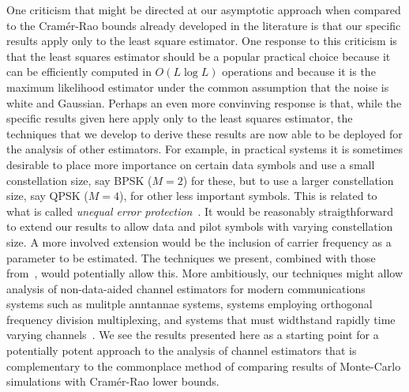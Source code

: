 \documentclass[journal]{IEEEtran}
\begin{document}

One criticism that might be directed at our asymptotic approach when compared to the Cram\'{e}r-Rao bounds already developed in the literature is that our specific results apply only to the least square estimator.  One response to this criticism is that the least squares estimator should be a popular practical choice because it can be efficiently computed in $O(L\log L)$ operations and because it is the maximum likelihood estimator under the common assumption that the noise is white and Gaussian.  Perhaps an even more convinving response is that, while the specific results given here apply only to the least squares estimator, the techniques that we develop to derive these results are now able to be deployed for the analysis of other estimators.  For example, in practical systems it is sometimes desirable to place more importance on certain data symbols and use a small constellation size, say BPSK ($M=2$) for these, but to use a larger constellation size, say QPSK ($M=4$), for other less important symbols.  This is related to what is called \emph{unequal error protection}~\cite{Aydinlik_turbo_uep_2008,Sandberg_uep_ldpc_2010}.  It would be reasonably straigthforward to extend our results to allow data and pilot symbols with varying constellation size.  A more involved extension would be the inclusion of carrier frequency as a parameter to be estimated.  The techniques we present, combined with those from~\cite{McKilliamFrequencyEstimationByPhaseUnwrapping2009,McKilliam_mean_dir_est_sq_arc_length2010}, would potentially allow this.  
More ambitiously, our techniques might allow analysis of non-data-aided channel estimators for modern communications systems such as mulitple anntannae systems, systems employing orthogonal frequency division multiplexing, and systems that must widthstand rapidly time varying channels~\cite{4138046,inthft:204506}.  We see the results presented here as a starting point for a potentially potent approach to the analysis of channel estimators that is complementary to the commonplace method of comparing results of Monte-Carlo simulations with Cram\'{e}r-Rao lower bounds.
\end{document}
